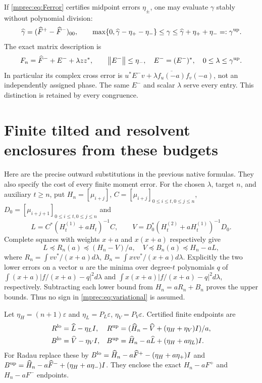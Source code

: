 \documentclass[11pt]{article}
\begin{document}
If \eqref{mprec:eq:Ferror} certifies midpoint errors $\eta_\pm$,
one may evaluate $\gamma$ stably without polynomial division:
\begin{equation}\label{mprec:eq:gammaout}
 \widehat\gamma=(\widehat F^+-\widehat F^-)_{00},\qquad
 \max\{0,\widehat\gamma-\eta_+-\eta_-\}\le\gamma
 \le\widehat\gamma+\eta_++\eta_-=: \gamma^{\rm up}.
\end{equation}
The exact matrix description is
\begin{equation}\label{mprec:eq:phaseout}
 F_n=\widehat F^-+E^-+\lambda zz^*,\qquad
 \left\lVert E^-\right\rVert\le\eta_-,\quad E^-=(E^-)^*,\quad
 0\le\lambda\le\gamma^{\rm up}.
\end{equation}
In particular its complex cross error is
$u^*E^-v+\lambda\overline{f_u(-a)}f_v(-a)$, not an
independently assigned phase. The same $E^-$ and scalar $\lambda$
serve every entry. This distinction is retained by every congruence.

\section{Finite tilted and resolvent enclosures from these budgets}

Here are the precise outward substitutions in the previous native
formulas. They also specify the cost of every finite moment error.
For the chosen $\lambda$, target $n$, and auxiliary $t\ge n$,
put $H_n=[\mu_{i+j}]$, $C=[\mu_{i+j}]_{0\le i\le t,0\le j\le n}$,
$D_0=[\mu_{i+j+1}]_{0\le i\le t,0\le j\le n}$ and
\[
 L=C^*(H_t^{(1)}+aH_t)^{-1}C,\qquad
 V=D_0^*(H_t^{(2)}+aH_t^{(1)})^{-1}D_0.
\]
Complete squares with weights $x+a$ and $x(x+a)$ respectively
give
\begin{equation}\label{mprec:eq:variational}
 L\preceq R_n(a)\preceq(H_n-V)/a,\quad
 V\preceq B_n(a)\preceq H_n-aL,
\end{equation}
where $R_n=\int vv^*/(x+a)d\lambda$,
$B_n=\int xvv^*/(x+a)d\lambda$. Explicitly the two lower
errors on a vector $u$ are the minima over degree-$t$ polynomials
$q$ of $\int(x+a)|f/(x+a)-q|^2d\lambda$ and
$\int x(x+a)|f/(x+a)-q|^2d\lambda$, respectively.
Subtracting each lower bound from $H_n=aR_n+B_n$ proves the
upper bounds. Thus no sign in \eqref{mprec:eq:variational} is assumed.

Let $\eta_H=(n+1)\varepsilon$ and $\eta_L=P_L\varepsilon$,
$\eta_V=P_V\varepsilon$. Certified finite endpoints are
\begin{equation}\label{mprec:eq:outvar}
 \begin{aligned}
 R^{\rm lo}&=\widehat L-\eta_LI,&
 R^{\rm up}&=(\widehat H_n-\widehat V+(\eta_H+\eta_V)I)/a,\\
 B^{\rm lo}&=\widehat V-\eta_VI,&
 B^{\rm up}&=\widehat H_n-a\widehat L+(\eta_H+a\eta_L)I.
 \end{aligned}
\end{equation}
For Radau replace these by
$B^{\rm lo}=\widehat H_n-a\widehat F^+-(\eta_H+a\eta_+)I$
and
$B^{\rm up}=\widehat H_n-a\widehat F^-+(\eta_H+a\eta_-)I$.
They enclose the exact $H_n-aF^+$ and $H_n-aF^-$ endpoints.
\end{document}
